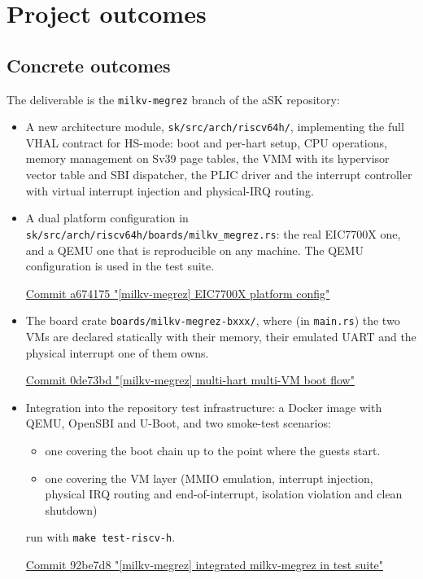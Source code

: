 \documentclass[10pt,a4]{article}
\begin{document}
\section{Project outcomes}

\subsection{Concrete outcomes}

The deliverable is the \texttt{milkv-megrez} branch of the aSK repository:

\begin{itemize}
\item A new architecture module, \texttt{sk/src/arch/riscv64h/}, implementing the
  full VHAL contract for HS-mode: boot and per-hart setup, CPU operations,
  memory management on Sv39 page tables, the VMM with its hypervisor
  vector table and SBI dispatcher, the PLIC driver and the interrupt controller with virtual
  interrupt injection and physical-IRQ routing.
\item A dual platform configuration in \texttt{sk/src/arch/riscv64h/boards/milkv\_megrez.rs}:
  the real EIC7700X one, and a QEMU one that is reproducible on any
  machine. The QEMU configuration is used in the test suite.

  \href{https://github.com/polimi-aos-lab/aSK/commit/a67417556fbbf4272e4b69bc4d37a015b91c15fe}
  {Commit a674175 "[milkv-megrez] EIC7700X platform config"}
\item The board crate \texttt{boards/milkv-megrez-bxxx/}, where (in \texttt{main.rs}) 
  the two VMs are declared statically with their memory,
  their emulated UART and the physical interrupt one of them owns.

  \href{https://github.com/polimi-aos-lab/aSK/commit/0de73bdfbcdef937a27c4903f2ae5304432a0d4c}
  {Commit 0de73bd "[milkv-megrez] multi-hart multi-VM boot flow"}
\item Integration into the repository test infrastructure: a Docker image with
  QEMU, OpenSBI and U-Boot, and two smoke-test scenarios:
  \begin{itemize}
  \item one covering the boot chain up to the point where the guests start.
  \item one covering the VM layer
  (MMIO emulation, interrupt injection, physical IRQ routing and end-of-interrupt,
  isolation violation and clean shutdown) 
  \end{itemize}
  
  run with \texttt{make test-riscv-h}.

  \href{https://github.com/polimi-aos-lab/aSK/commit/92be7d80fde63282afa43e8bfbbe2b73be3b400b}
  {Commit 92be7d8 "[milkv-megrez] integrated milkv-megrez in test suite"}
\end{itemize}
\end{document}
